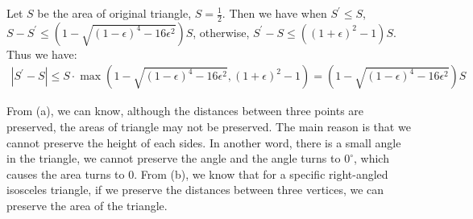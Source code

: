 Let $S$ be the area of original triangle, $S=\frac{1}{2}$.
Then we have 
when $S^{\prime}\le S$, $S-S^{\prime}\le (1-\sqrt{(1-\epsilon)^4-16\epsilon^2})S$,
otherwise, $S^{\prime}-S \le ((1+\epsilon)^2-1)S$.
Thus we have:
\begin{align}
    \nonumber |S^{\prime}-S|\le S \cdot \max(1-\sqrt{(1-\epsilon)^4-16\epsilon^2}, (1+\epsilon)^2-1)=(1-\sqrt{(1-\epsilon)^4-16\epsilon^2})S
\end{align}

From (a), we can know, although the distances between three points are preserved, the areas of triangle may not be preserved.
The main reason is that we cannot preserve the height of each sides. In another word, there is a small angle in the triangle, we cannot preserve the angle and the angle turns to $0^{\circ}$, which causes the area turns to $0$.
From (b), we know that for a specific right-angled isosceles triangle, if we preserve the distances between three vertices, we can preserve the area of the triangle.

